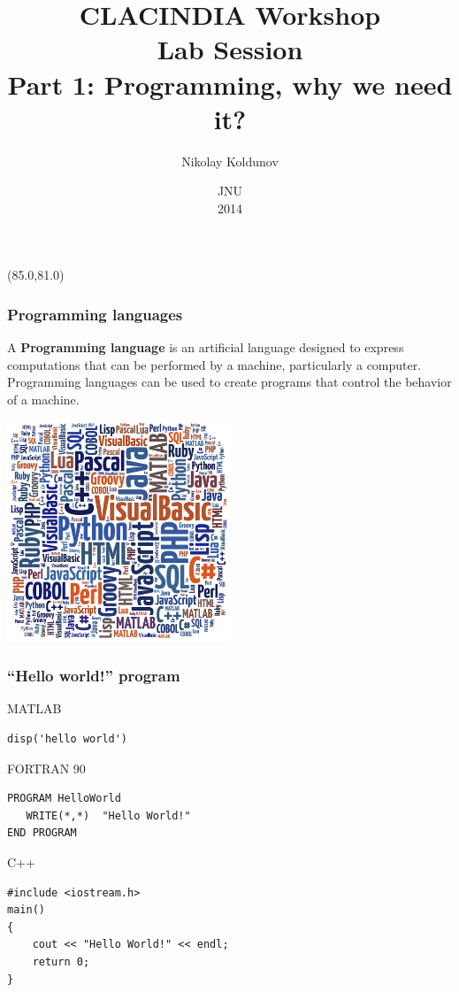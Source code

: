 \documentclass{beamer}
\title{CLACINDIA Workshop \\
Lab Session\\
       Part 1:  Programming, why we need it?}
\author{Nikolay Koldunov}
\date{JNU\\
       2014}
\newcommand{\MyLogo}{%
\begin{textblock}{14}(85.0,81.0)
  \pgfuseimage{logo}
\end{textblock}
}
\begin{document}
\begin{frame}
\titlepage
\MyLogo
\end{frame}


\begin{frame}[fragile]
\frametitle{Programming languages}

A \textbf{Programming language} is an artificial language designed to express computations that can be performed by a machine, particularly a computer. Programming languages can be used to create programs that control the behavior of a machine.
\begin{center}
\includegraphics[width=0.5\textwidth,angle=00]{languages.jpg}
\end{center}
\end{frame}

\begin{frame}[fragile]
\frametitle{``Hello world!'' program}

\begin{block}{MATLAB}
  \begin{lstlisting}
disp('hello world')
  \end{lstlisting}
\end{block}

\pause

\begin{block}{FORTRAN 90}
  \begin{lstlisting}
PROGRAM HelloWorld
   WRITE(*,*)  "Hello World!"
END PROGRAM
  \end{lstlisting}
\end{block}

\pause

\begin{block}{C++}
  \begin{lstlisting}
#include <iostream.h>
main()
{
    cout << "Hello World!" << endl;
    return 0;
}
  \end{lstlisting}
\end{block}


\end{frame}
\end{document}
